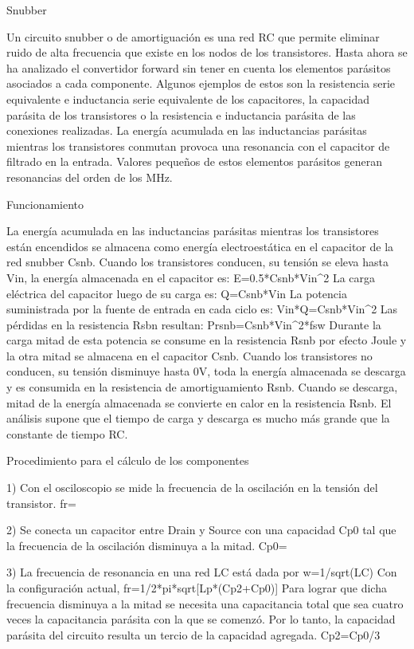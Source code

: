 Snubber

Un circuito snubber o de amortiguación es una red RC que permite eliminar ruido de alta frecuencia que existe en los nodos de los transistores.
Hasta ahora se ha analizado el convertidor forward sin tener en cuenta los elementos parásitos asociados a cada componente. 
Algunos ejemplos de estos son la resistencia serie equivalente e inductancia serie equivalente de los capacitores, 
la capacidad parásita de los transistores o la resistencia e inductancia parásita de las conexiones realizadas. 
La energía acumulada en las inductancias parásitas mientras los transistores conmutan provoca una resonancia con el capacitor de filtrado en la entrada. 
Valores pequeños de estos elementos parásitos generan resonancias del orden de los MHz. 

Funcionamiento 

La energía acumulada en las inductancias parásitas mientras los transistores están encendidos se almacena como energía electroestática en el capacitor de la red snubber Csnb. 
Cuando los transistores conducen, su tensión se eleva hasta Vin, la energía almacenada en el capacitor es: 
E=0.5*Csnb*Vin^2
La carga eléctrica del capacitor luego de su carga es:
Q=Csnb*Vin
La potencia suministrada por la fuente de entrada en cada ciclo es:
Vin*Q=Csnb*Vin^2
Las pérdidas en la resistencia Rsbn resultan:
Prsnb=Csnb*Vin^2*fsw
Durante la carga mitad de esta potencia se consume en la resistencia Rsnb por efecto Joule y la otra mitad se almacena en el capacitor Csnb. 
Cuando los transistores no conducen, su tensión disminuye hasta 0V, toda la energía almacenada se descarga y es consumida en la resistencia de amortiguamiento Rsnb.
Cuando se descarga, mitad de la energía almacenada se convierte en calor en la resistencia Rsnb. 
El análisis supone que el tiempo de carga y descarga es mucho más grande que la constante de tiempo RC. 

Procedimiento para el cálculo de los componentes

1) Con el osciloscopio se mide la frecuencia de la oscilación en la tensión del transistor. 
fr=

2) Se conecta un capacitor entre Drain y Source con una capacidad Cp0 tal que la frecuencia de la oscilación disminuya a la mitad. 
Cp0=

3) La frecuencia de resonancia en una red LC está dada por 
w=1/sqrt(LC)
Con la configuración actual, 
fr=1/{2*pi*sqrt[Lp*(Cp2+Cp0)]}
Para lograr que dicha frecuencia disminuya a la mitad se necesita una capacitancia total que sea cuatro veces la capacitancia parásita con la que se comenzó.
Por lo tanto, la capacidad parásita del circuito resulta un tercio de la capacidad agregada.
Cp2=Cp0/3

